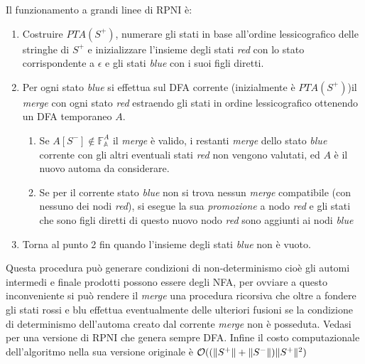 Il funzionamento a grandi linee di RPNI è:
\begin{enumerate}
\item Costruire $PTA(S^{+})$, numerare gli stati in base all'ordine lessicografico delle stringhe di $S^{+}$ e inizializzare l'insieme degli stati \textit{red} con lo stato corrispondente a $\epsilon$ e gli stati \textit{blue} con i suoi figli diretti.

\item Per ogni stato \textit{blue} si effettua sul \ac{DFA} corrente (inizialmente è $PTA(S^{+})$)il \textit{merge} con ogni stato \textit{red} estraendo gli stati in ordine lessicografico ottenendo un \ac{DFA} temporaneo $A$.
\begin{enumerate}
\item Se $A[S^{-}] \not\in \mathbb{F}_{\mathbb{A}}^{A}$ il \textit{merge} è valido, i restanti \textit{merge} dello stato \textit{blue} corrente con gli altri eventuali stati \textit{red} non vengono valutati, ed $A$ è il nuovo automa da considerare.
\item Se per il corrente stato \textit{blue} non si trova nessun \textit{merge} compatibile (con nessuno dei nodi \textit{red}), si esegue la sua \textit{promozione} a nodo \textit{red} e gli stati che sono figli diretti di questo nuovo nodo \textit{red} sono aggiunti ai nodi \textit{blue}
\end{enumerate}
\item Torna al punto 2 fin quando l'insieme degli stati \textit{blue} non è vuoto.
\end{enumerate}

Questa procedura può generare condizioni di non-determinismo cioè gli automi intermedi e finale prodotti possono essere degli NFA, per ovviare a questo inconveniente si può rendere il \textit{merge} una procedura ricorsiva che oltre a fondere gli stati rossi e blu effettua eventualmente delle ulteriori fusioni se la condizione di determinismo dell'automa creato dal corrente \textit{merge} non è posseduta. Vedasi \cite{DeLaHiguera10} per una versione di RPNI che genera sempre \ac{DFA}.
Infine il costo computazionale dell'algoritmo nella sua versione originale \cite{Oncina92} è $\mathcal{O}( (\lVert S^{+}\rVert+\lVert S^{-}\rVert)\lVert S^{+}\rVert^{2} )$

